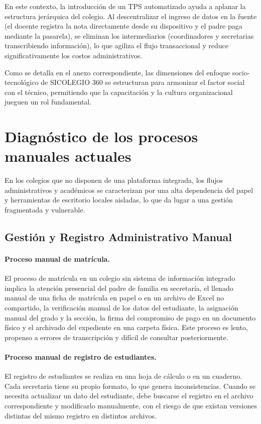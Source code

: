 \documentclass[12pt,a4paper,oneside]{report}
\begin{document}
En este contexto, la introducción de un TPS automatizado ayuda a aplanar la estructura jerárquica del colegio. Al descentralizar el ingreso de datos en la fuente (el docente registra la nota directamente desde su dispositivo y el padre paga mediante la pasarela), se eliminan los intermediarios (coordinadores y secretarias transcribiendo información), lo que agiliza el flujo transaccional y reduce significativamente los costos administrativos.

Como se detalla en el anexo correspondiente, las dimensiones del enfoque socio-tecnológico de SICOLEGIO 360 se estructuran para armonizar el factor social con el técnico, permitiendo que la capacitación y la cultura organizacional jueguen un rol fundamental.

\section{Diagnóstico de los procesos manuales actuales}

En los colegios que no disponen de una plataforma integrada, los flujos administrativos y académicos se caracterizan por una alta dependencia del papel y herramientas de escritorio locales aisladas, lo que da lugar a una gestión fragmentada y vulnerable.

\subsection{Gestión y Registro Administrativo Manual}

\paragraph{Proceso manual de matrícula.} El proceso de matrícula en un colegio sin sistema de información integrado implica la atención presencial del padre de familia en secretaría, el llenado manual de una ficha de matrícula en papel o en un archivo de Excel no compartido, la verificación manual de los datos del estudiante, la asignación manual del grado y la sección, la firma del compromiso de pago en un documento físico y el archivado del expediente en una carpeta física. Este proceso es lento, propenso a errores de transcripción y difícil de consultar posteriormente.

\paragraph{Proceso manual de registro de estudiantes.} El registro de estudiantes se realiza en una hoja de cálculo o en un cuaderno. Cada secretaria tiene su propio formato, lo que genera inconsistencias. Cuando se necesita actualizar un dato del estudiante, debe buscarse el registro en el archivo correspondiente y modificarlo manualmente, con el riesgo de que existan versiones distintas del mismo registro en distintos archivos.
\end{document}
